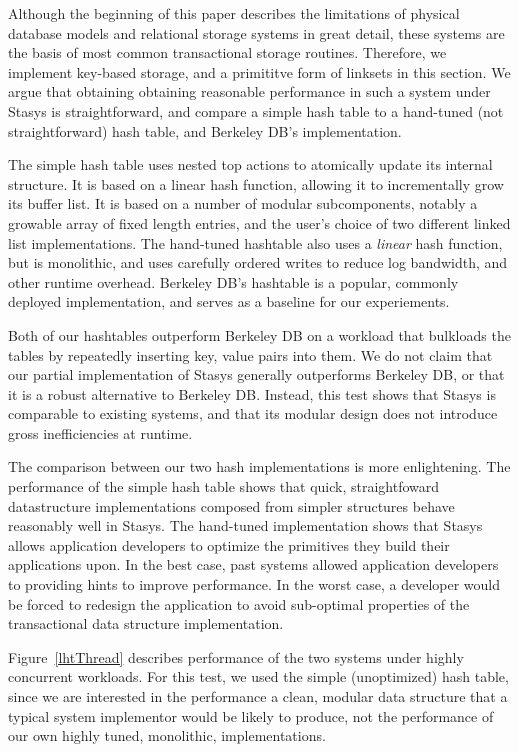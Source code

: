 \documentclass[letterpaper,twocolumn,10pt]{article}
\newcommand{\yad}{Stasys\xspace}
\begin{document}
Although the beginning of this paper describes the limitations of
physical database models and relational storage systems in great
detail, these systems are the basis of most common transactional
storage routines.  Therefore, we implement key-based storage, and a
primititve form of linksets in this section.  We argue that obtaining
obtaining reasonable performance in such a system under \yad is
straightforward, and compare a simple hash table to a hand-tuned (not
straightforward) hash table, and Berkeley DB's implementation.

The simple hash table uses nested top actions to atomically update its
internal structure.  It is based on a linear hash function, allowing
it to incrementally grow its buffer list.  It is based on a number of
modular subcomponents, notably a growable array of fixed length
entries, and the user's choice of two different linked list
implementations.  The hand-tuned hashtable also uses a {\em linear} hash
function,~\cite{lht} but is monolithic, and uses carefully ordered writes to
reduce log bandwidth, and other runtime overhead.  Berkeley DB's
hashtable is a popular, commonly deployed implementation, and serves
as a baseline for our experiements.

Both of our hashtables outperform Berkeley DB on a workload that
bulkloads the tables by repeatedly inserting key, value pairs into
them.  We do not claim that our partial implementation of \yad
generally outperforms Berkeley DB, or that it is a robust alternative
to Berkeley DB.  Instead, this test shows that \yad is comparable to
existing systems, and that its modular design does not introduce gross
inefficiencies at runtime.

The comparison between our two hash implementations is more
enlightening.  The performance of the simple hash table shows that
quick, straightfoward datastructure implementations composed from
simpler structures behave reasonably well in \yad.  The hand-tuned
implementation shows that \yad allows application developers to
optimize the primitives they build their applications upon.  In the
best case, past systems allowed application developers to providing
hints to improve performance.  In the worst case, a developer would be
forced to redesign the application to avoid sub-optimal properties of
the transactional data structure implementation.

Figure~\ref{lhtThread} describes performance of the two systems under
highly concurrent workloads.  For this test, we used the simple
(unoptimized) hash table, since we are interested in the performance a
clean, modular data structure that a typical system implementor would
be likely to produce, not the performance of our own highly tuned,
monolithic, implementations.
\end{document}
